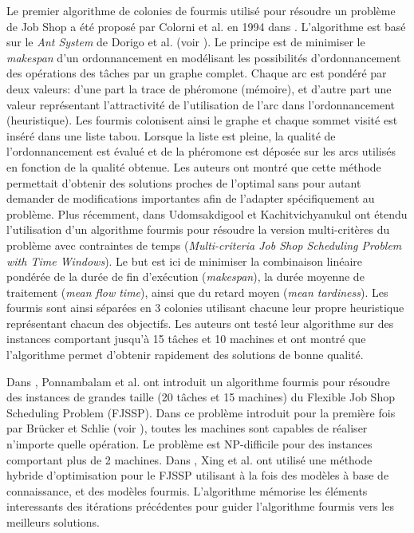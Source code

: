 Le premier algorithme de colonies de fourmis utilisé pour résoudre un problème de Job Shop a été proposé par Colorni et al. en 1994 dans \cite{Colorni1994}. L'algorithme est basé sur le \textit{Ant System} de Dorigo et al. (voir \cite{Dorigo1992}). Le principe est de minimiser le \textit{makespan} d'un ordonnancement en modélisant les possibilités d'ordonnancement des opérations des tâches par un graphe complet. Chaque arc est pondéré par deux valeurs: d'une part la trace de phéromone (mémoire), et d'autre part une valeur représentant l'attractivité de l'utilisation de l'arc dans l'ordonnancement (heuristique). Les fourmis colonisent ainsi le graphe et chaque sommet visité est inséré dans une liste tabou. Lorsque la liste est pleine, la qualité de l'ordonnancement est évalué et de la phéromone est déposée sur les arcs utilisés en fonction de la qualité obtenue. Les auteurs ont montré que cette méthode permettait d'obtenir des solutions proches de l'optimal sans pour autant demander de modifications 
importantes afin de l'adapter spécifiquement au problème.
Plus récemment, dans \cite{Udomsakdigool2011} Udomsakdigool et Kachitvichyanukul ont étendu l'utilisation d'un algorithme fourmis pour résoudre la version multi-critères du problème avec contraintes de temps (\textit{Multi-criteria Job Shop Scheduling Problem with Time Windows}). Le but est ici de minimiser la combinaison linéaire pondérée de la durée de fin d'exécution (\textit{makespan}), la durée moyenne de traitement (\textit{mean flow time}), ainsi que du retard moyen (\textit{mean tardiness}). Les fourmis sont ainsi séparées en 3 colonies utilisant chacune leur propre heuristique représentant chacun des objectifs. Les auteurs ont testé leur algorithme sur des instances comportant jusqu'à 15 tâches et 10 machines et ont montré que l'algorithme permet d'obtenir rapidement des solutions de bonne qualité.

Dans \cite{Ponnambalam2005}, Ponnambalam et al. ont introduit un algorithme fourmis pour résoudre des instances de grandes taille (20 tâches et 15 machines) du Flexible Job Shop Scheduling Problem (FJSSP). Dans ce problème introduit pour la première fois par Brücker et Schlie (voir \cite{Brucker1990}), toutes les machines sont capables de réaliser n'importe quelle opération. Le problème est NP-difficile pour des instances comportant plus de 2 machines.
Dans \cite{Xing2010}, Xing et al. ont utilisé une méthode hybride d'optimisation pour le FJSSP utilisant à la fois des modèles à base de connaissance, et des modèles fourmis. L'algorithme mémorise les éléments interessants des itérations précédentes pour guider l'algorithme fourmis vers les meilleurs solutions.

